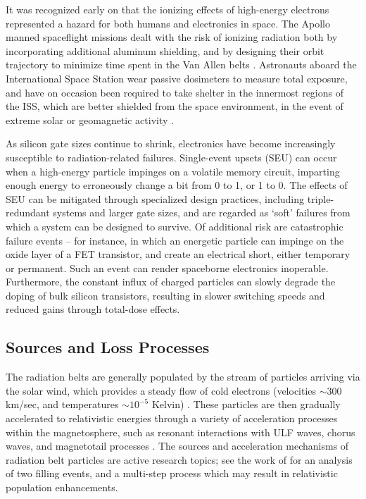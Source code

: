 It was recognized early on that the ionizing effects of high-energy electrons represented a hazard for both humans and electronics in space. The Apollo manned spaceflight missions dealt with the risk of ionizing radiation both by incorporating additional aluminum shielding, and by designing their orbit trajectory to minimize time spent in the Van Allen belts \citep{Apollo1973}. Astronauts aboard the International Space Station wear passive dosimeters to measure total exposure, and have on occasion been required to take shelter in the innermost regions of the ISS, which are better shielded from the space environment, in the event of extreme solar or geomagnetic activity \citep{ugh}. 

As silicon gate sizes continue to shrink, electronics have become increasingly susceptible to radiation-related failures. Single-event upsets (SEU) can occur when a high-energy particle impinges on a volatile memory circuit, imparting enough energy to erroneously change a bit from 0 to 1, or 1 to 0. The effects of SEU can be mitigated through specialized design practices, including triple-redundant systems and larger gate sizes, and are regarded as `soft' failures from which a system can be designed to survive. Of additional risk are catastrophic failure events -- for instance, in which an energetic particle can impinge on the oxide layer of a FET transistor, and create an electrical short, either temporary or permanent. Such an event can render spaceborne electronics inoperable. Furthermore, the constant influx of charged particles can slowly degrade the doping of bulk silicon transistors, resulting in slower switching speeds and reduced gains through total-dose effects.

\subsection{Sources and Loss Processes}
The radiation belts are generally populated by the stream of particles arriving via the solar wind, which provides a steady flow of cold electrons (velocities $\sim 300$ km/sec, and temperatures $\sim 10^{-5}$ Kelvin) \citep{Montgomery1974, Tascione1988}. These particles are then gradually accelerated to relativistic energies through a variety of acceleration processes within the magnetosphere, such as resonant interactions with ULF waves, chorus waves, and magnetotail processes \citep{Shprits2006,  Bortnik2007a, Thorne2013}. The sources and acceleration mechanisms of radiation belt particles are active research topics; see the work of \cite{Jaynes2015} for an analysis of two filling events, and a multi-step process which may result in relativistic population enhancements.

